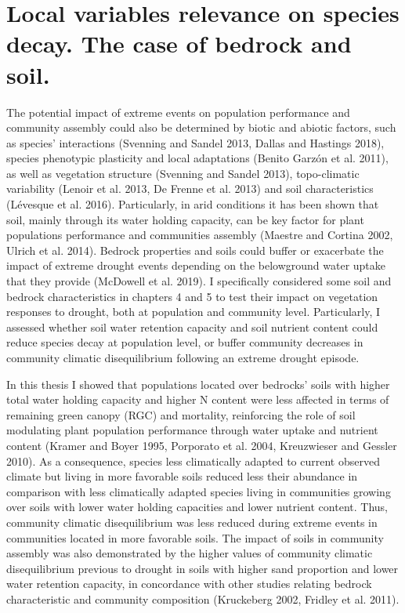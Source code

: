\documentclass[11pt,twoside]{reedthesis}
\begin{document}
\section{Local variables relevance on species decay. The case of bedrock
and
soil.}\label{local-variables-relevance-on-species-decay.-the-case-of-bedrock-and-soil.}

The potential impact of extreme events on population performance and
community assembly could also be determined by biotic and abiotic
factors, such as species' interactions (Svenning and Sandel 2013, Dallas
and Hastings 2018), species phenotypic plasticity and local adaptations
(Benito Garzón et al. 2011), as well as vegetation structure (Svenning
and Sandel 2013), topo-climatic variability (Lenoir et al. 2013, De
Frenne et al. 2013) and soil characteristics (Lévesque et al. 2016).
Particularly, in arid conditions it has been shown that soil, mainly
through its water holding capacity, can be key factor for plant
populations performance and communities assembly (Maestre and Cortina
2002, Ulrich et al. 2014). Bedrock properties and soils could buffer or
exacerbate the impact of extreme drought events depending on the
belowground water uptake that they provide (McDowell et al. 2019). I
specifically considered some soil and bedrock characteristics in
chapters 4 and 5 to test their impact on vegetation responses to
drought, both at population and community level. Particularly, I
assessed whether soil water retention capacity and soil nutrient content
could reduce species decay at population level, or buffer community
decreases in community climatic disequilibrium following an extreme
drought episode.\par

In this thesis I showed that populations located over bedrocks' soils
with higher total water holding capacity and higher N content were less
affected in terms of remaining green canopy (RGC) and mortality,
reinforcing the role of soil modulating plant population performance
through water uptake and nutrient content (Kramer and Boyer 1995,
Porporato et al. 2004, Kreuzwieser and Gessler 2010). As a consequence,
species less climatically adapted to current observed climate but living
in more favorable soils reduced less their abundance in comparison with
less climatically adapted species living in communities growing over
soils with lower water holding capacities and lower nutrient content.
Thus, community climatic disequilibrium was less reduced during extreme
events in communities located in more favorable soils. The impact of
soils in community assembly was also demonstrated by the higher values
of community climatic disequilibrium previous to drought in soils with
higher sand proportion and lower water retention capacity, in
concordance with other studies relating bedrock characteristic and
community composition (Kruckeberg 2002, Fridley et al. 2011).\par
\newpage
\end{document}
